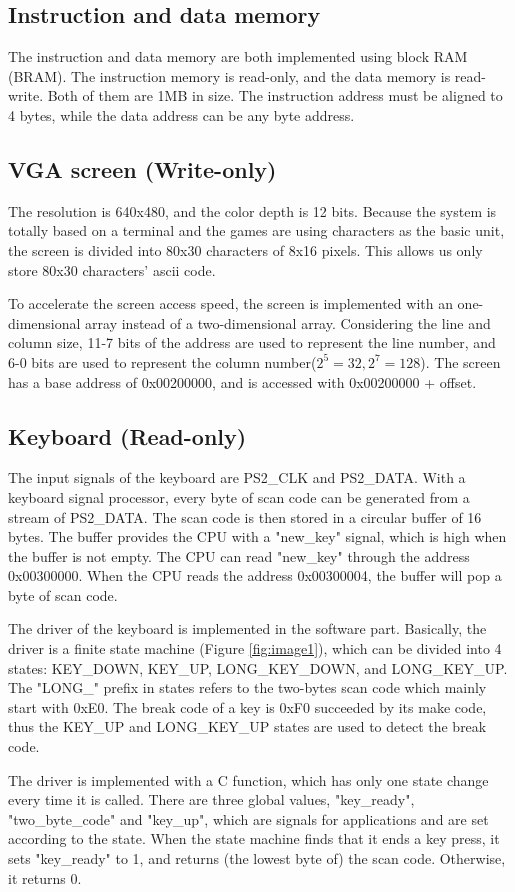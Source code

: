 \documentclass[
	a4paper, %
	11pt, %
]{CSUniSchoolLabReport}
\begin{document}
\subsection{Instruction and data memory}
The instruction and data memory are both implemented using block RAM (BRAM). The instruction memory is read-only, and the data memory is read-write. Both of them are 1MB in size. The instruction address must be aligned to 4 bytes, while the data address can be any byte address.
\subsection{VGA screen (Write-only)}
The resolution is 640x480, and the color depth is 12 bits. Because the system is totally based on a terminal and the games are using characters as the basic unit, the screen is divided into 80x30 characters of 8x16 pixels. This allows us only store 80x30 characters' ascii code.

To accelerate the screen access speed, the screen is implemented with an one-dimensional array instead of a two-dimensional array. Considering the line and column size, 11-7 bits of the address are used to represent the line number, and 6-0 bits are used to represent the column number($2^5=32,2^7=128$). The screen has a base address of 0x00200000, and is accessed with 0x00200000 + offset.
\subsection{Keyboard (Read-only)}
The input signals of the keyboard are PS2\_CLK and PS2\_DATA. With a keyboard signal processor, every byte of scan code can be generated from a stream of PS2\_DATA. The scan code is then stored in a circular buffer of 16 bytes. The buffer provides the CPU with a "new\_key" signal, which is high when the buffer is not empty. The CPU can read "new\_key" through the address 0x00300000. When the CPU reads the address 0x00300004, the buffer will pop a byte of scan code.

The driver of the keyboard is implemented in the software part. Basically, the driver is a finite state machine (Figure \ref{fig:image1}), which can be divided into 4 states: KEY\_DOWN, KEY\_UP, LONG\_KEY\_DOWN, and LONG\_KEY\_UP. The "LONG\_" prefix in states refers to the two-bytes scan code which mainly start with 0xE0. The break code of a key is 0xF0 succeeded by its make code, thus the KEY\_UP and LONG\_KEY\_UP states are used to detect the break code.

The driver is implemented with a C function, which has only one state change every time it is called. There are three global values, "key\_ready", "two\_byte\_code" and "key\_up", which are signals for applications and are set according to the state. When the state machine finds that it ends a key press, it sets "key\_ready" to 1, and returns (the lowest byte of) the scan code. Otherwise, it returns 0.
\end{document}
